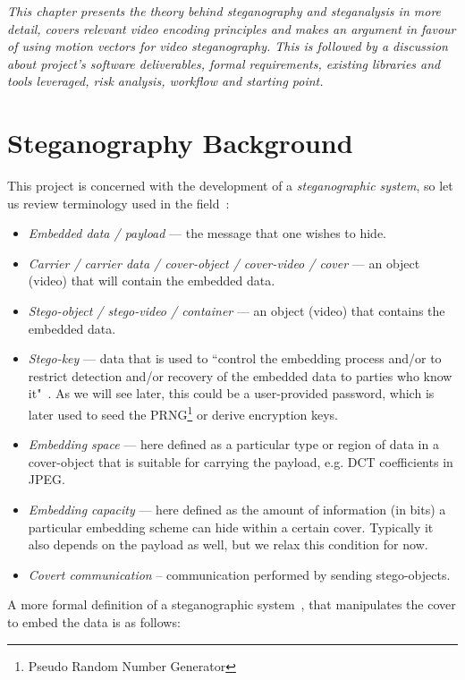 \documentclass[12pt,british,twoside,notitlepage,usenames,dvipsnames,hypens,final]{report}
\numberwithin{equation}{section}
\numberwithin{figure}{section}
\begin{document}
\textit{This chapter presents the theory behind steganography and steganalysis in more detail, covers relevant video encoding principles and makes an argument in favour of using motion vectors for video steganography. This is followed by a discussion about project's software deliverables, formal requirements, existing libraries and tools leveraged, risk analysis, workflow and starting point. } 

\section{Steganography Background}

This project is concerned with the development of a \emph{steganographic system}, so let us review terminology used in the field~\cite{infohiding-survey, bateman}:
\begin{itemize}
\item \emph{Embedded data / payload} --- the message that one wishes to hide.
\item \emph{Carrier / carrier data / cover-object / cover-video / cover} --- an object (video) that will contain the embedded data.
\item \emph{Stego-object / stego-video / container } --- an object (video) that contains the embedded data.
\item \emph{Stego-key} ---  data that is used to ``control the embedding process and/or to restrict detection and/or recovery of the embedded data to parties who know it"~\cite{infohiding-survey}. As we will see later, this could be a user-provided password, which is later used to seed the PRNG\footnote{Pseudo Random Number Generator} or derive encryption keys. 
\item \emph{Embedding space} --- here defined as a particular type or region of data in a cover-object that is suitable for carrying the payload, e.g. DCT coefficients in JPEG.
\item \emph{Embedding capacity} --- here defined as the amount of information (in bits) a particular embedding scheme can hide within a certain cover. Typically it also depends on the payload as well, but we relax this condition for now.
\item \emph{Covert communication} -- communication performed by sending stego-objects. 
\end{itemize}

A more formal definition of a steganographic system~\cite{scott-fs}, that manipulates the cover to embed the data is as follows:
\end{document}
